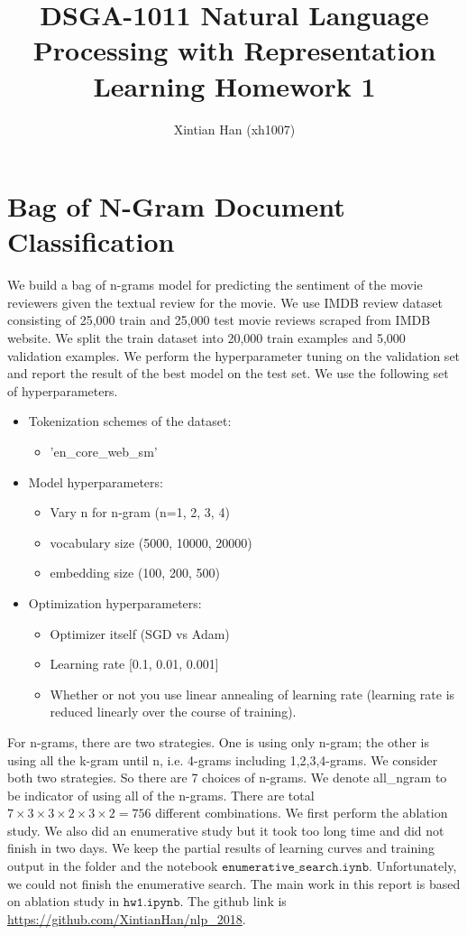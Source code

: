 \documentclass[10pt,a4paper]{article}
\title{DSGA-1011 Natural Language Processing with Representation Learning Homework 1
}
\author{Xintian Han (xh1007)}
\begin{document}
\maketitle
\section{Bag of N-Gram Document Classification} 
We build a bag of n-grams model for predicting the sentiment of the movie reviewers given the textual review for the movie. We use IMDB review dataset consisting of 25,000 train and 25,000 test movie reviews scraped from IMDB website. We split the train dataset into 20,000 train examples and 5,000 validation examples. We perform the hyperparameter tuning on the validation set and report the result of the best model on the test set. We use the following set of hyperparameters.
\begin{itemize}
\item Tokenization schemes of the dataset: 
\begin{itemize}
\item 'en\_core\_web\_sm'	
\end{itemize}
\item Model hyperparameters:
\begin{itemize}
\item Vary n for n-gram (n=1, 2, 3, 4)
\item vocabulary size (5000, 10000, 20000)
\item embedding size (100, 200, 500)
\end{itemize}
\item Optimization hyperparameters:
\begin{itemize}
\item Optimizer itself (SGD vs Adam)
\item Learning rate [0.1, 0.01, 0.001]
\item Whether or not you use linear annealing of learning rate (learning rate is reduced linearly over the course of training).	
\end{itemize}
\end{itemize}
For n-grams, there are two strategies. One is using only n-gram; the other is using all the k-gram until n, i.e. 4-grams including 1,2,3,4-grams. We consider both two strategies. So there are 7 choices of n-grams. We denote all\_ngram to be indicator of using all of the n-grams. There are total $7\times 3 \times 3\times 2 \times 3 \times 2 = 756$ different combinations. We first perform the ablation study. We also did an enumerative study but it took too long time and did not finish in two days. We keep the partial results of learning curves and training output in the folder and the notebook $\texttt{enumerative\_search.iynb}$. Unfortunately, we could not finish the enumerative search. The main work in this report is based on ablation study in $\texttt{hw1.ipynb}$. The github link is \href{https://github.com/XintianHan/nlp_2018}{https://github.com/XintianHan/nlp\_2018}.
\end{document}
